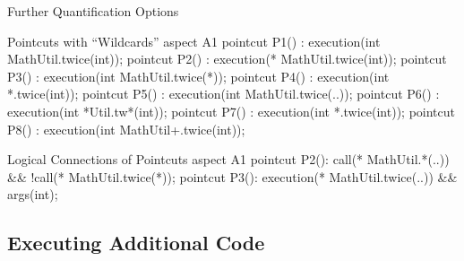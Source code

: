\begin{frame}[fragile]{Further Quantification Options}
	\begin{mycolumns}[widths={70,30},animation=none]
\begin{codetight}{Pointcuts with ``Wildcards''}
aspect A1 {
	pointcut P1() : execution(int MathUtil.twice(int));
	pointcut P2() : execution(* MathUtil.twice(int));
	pointcut P3() : execution(int MathUtil.twice(*));
	pointcut P4() : execution(int *.twice(int));
	pointcut P5() : execution(int MathUtil.twice(..));
	pointcut P6() : execution(int *Util.tw*(int));
	pointcut P7() : execution(int *.twice(int));
	pointcut P8() : execution(int MathUtil+.twice(int));
}
\end{codetight}
\begin{codetight}{Logical Connections of Pointcuts}
aspect A1 {
	pointcut P2(): call(* MathUtil.*(..)) && !call(* MathUtil.twice(*));
	pointcut P3(): execution(* MathUtil.twice(..)) && args(int);
}
\end{codetight}
	\mynextcolumn
		
		\vspace{1cm}
		
	\end{mycolumns}
\end{frame}

\subsection{Executing Additional Code}


